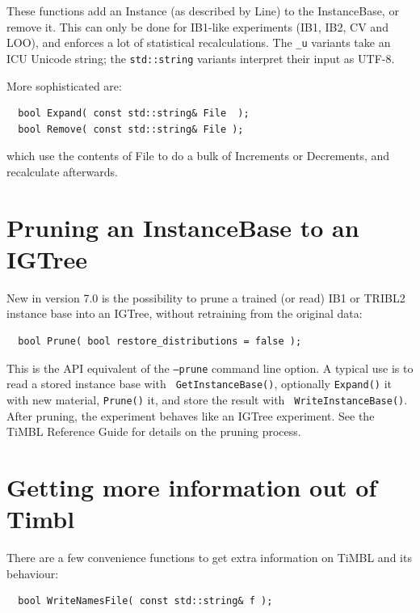 \documentclass{report}
\begin{document}
These functions add an Instance (as described by Line) to the
InstanceBase, or remove it.  This can only be done for IB1-like
experiments (IB1, IB2, CV and LOO), and enforces a lot of
statistical recalculations. The {\tt \_u} variants take an ICU
Unicode string; the {\tt std::string} variants interpret their input
as UTF-8.

More sophisticated are:

\begin{footnotesize}
\begin{verbatim}
  bool Expand( const std::string& File  );
  bool Remove( const std::string& File );
\end{verbatim}
\end{footnotesize}

which use the contents of File to do a bulk of Increments or Decrements, and
recalculate afterwards.

\section{Pruning an InstanceBase to an IGTree}
\label{prune}

New in version 7.0 is the possibility to prune a trained (or read)
IB1 or TRIBL2 instance base into an IGTree, without retraining from
the original data:

\begin{footnotesize}
\begin{verbatim}
  bool Prune( bool restore_distributions = false );
\end{verbatim}
\end{footnotesize}

This is the API equivalent of the {\tt --prune} command line
option. A typical use is to read a stored instance base with {\tt
  GetInstanceBase()}, optionally {\tt Expand()} it with new material,
{\tt Prune()} it, and store the result with {\tt
  WriteInstanceBase()}. After pruning, the experiment behaves like an
IGTree experiment. See the TiMBL Reference Guide \cite{Daelemans+26}
for details on the pruning process.

\section{Getting more information out of Timbl}

There are a few convenience functions to get extra information on
TiMBL and its behaviour:

\begin{footnotesize}
\begin{verbatim}
  bool WriteNamesFile( const std::string& f );
\end{verbatim}
\end{footnotesize}
\end{document}
